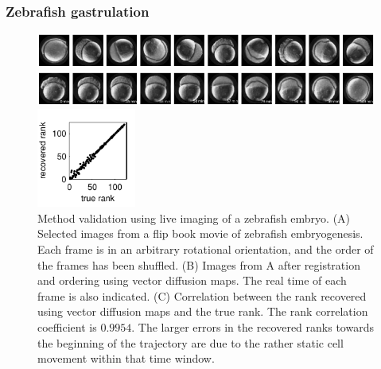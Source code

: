 \documentclass[twocolumn, 10pt]{article}
\begin{document}
\subsubsection*{Zebrafish gastrulation}

\begin{figure}[t]
\begin{minipage}[c]{13.75cm}
\vspace{0cm}
\includegraphics[width=13cm]{zebrafish_scrambled}

\includegraphics[width=13cm]{zebrafish_ordered}
\end{minipage}
%
\hfill
%
\begin{minipage}[c]{3.75cm}

\vspace{0cm}
%
\includegraphics[width=3.25cm]{zebrafish_rank_corr}
\end{minipage}
\caption{Method validation using live imaging of a zebrafish embryo. (A) Selected images from a flip book movie of zebrafish embryogenesis. Each frame is in an arbitrary rotational orientation, and the order of the frames has been shuffled. (B) Images from A after registration and ordering using vector diffusion maps. The real time of each frame is also indicated. (C) Correlation between the rank recovered using vector diffusion maps and the true rank.  The rank correlation coefficient is $0.9954$. The larger errors in the recovered ranks towards the beginning of the trajectory are due to the rather static cell movement within that time window. }
\label{fig:zebrafish}
\end{figure}
\end{document}
